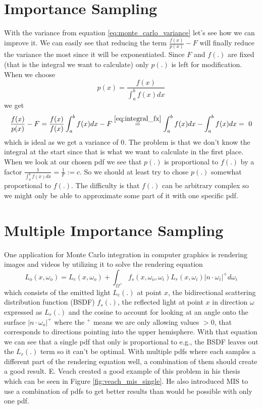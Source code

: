 \section{Importance Sampling}
\label{sec:importance_sampling}
With the variance from equation \ref{eq:monte_carlo_variance} let's see how we can improve it.
We can easily see that reducing the term $ \frac{f(x)}{p(x)} - F $ will finally reduce the variance the most since it will be exponentiated.
Since $ F $ and $ f(.) $ are fixed (that is the integral we want to calculate) only $ p(.) $ is left for modification.
When we choose $$ p(x) = \frac{f(x)}{\int_{a}^b f(x) dx} $$ we get
\begin{equation}
\label{eq:zero_variance}
    \frac{f(x)}{p(x)} - F = \frac{f(x)}{f(x)}\int_{a}^b f(x) dx - F
    \overset{\ref{eq:integral_fx}}= \int_{a}^b f(x) dx - \int_{a}^b f(x) dx
        =~0
\end{equation}
which is ideal as we get a variance of 0.
The problem is that we don't know the integral at the start since that is what we want to calculate in the first place.
When we look at our chosen pdf we see that $ p(.) $ is proportional to $ f(.) $ by a factor $ \frac{1}{\int_{a}^b f(x) dx} = \frac{1}{F} := c $.
So we should at least try to chose $ p(.) $ somewhat proportional to $ f(.) $.
The difficulty is that $ f(.) $ can be arbitrary complex so we might only be able to approximate some part of it with one specific pdf.


\section{Multiple Importance Sampling}
\label{sec:multiple_importance_sampling}
One application for Monte Carlo integration in computer graphics is rendering images and videos by utilizing it
to solve the rendering equation
\begin{equation}
    \label{eq:rendering_equation}
    L_o(x, \omega_o) = L_e(x, \omega_o) + \int_{\Omega^+} f_s(x, \omega_o, \omega_i) L_r(x, \omega_i) |n \cdot \omega_i|^+ d\omega_i
\end{equation}
which consists of the emitted light $ L_e(.) $ at point $ x $,
the bidirectional scattering distribution function (BSDF) $ f_s(.) $,
the reflected light at point $ x $ in direction $ \omega $ expressed as $ L_r(.) $
and the cosine to account for looking at an angle onto the surface $ |n \cdot \omega_o|^+ $
where the $ ^+ $ means we are only allowing values $ > 0 $,
that corresponds to directions pointing into the upper hemisphere.
With that equation we can see that a single pdf that only is proportional to e.g., the BSDF leaves out the $ L_r(.) $ term so it can't be optimal.
With multiple pdfs where each samples a different part of the rendering equation well,
a combination of them should create a good result.
E. Veach created a good example of this problem in his thesis~\cite{veach-thesis} which can be seen in Figure \ref{fig:veach_mis_single}.
He also introduced MIS to use a combination of pdfs to get better results than would be possible with only one pdf.


